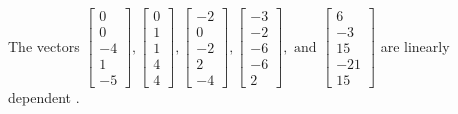 \begin{exercise}
\begin{exerciseStatement}
  \end{exerciseStatement}
  \begin{exerciseAnswer}
   The vectors \(\left[\begin{array}{r}
0 \\
0 \\
-4 \\
1 \\
-5
\end{array}\right] , \left[\begin{array}{r}
0 \\
1 \\
1 \\
4 \\
4
\end{array}\right] , \left[\begin{array}{r}
-2 \\
0 \\
-2 \\
2 \\
-4
\end{array}\right] , \left[\begin{array}{r}
-3 \\
-2 \\
-6 \\
-6 \\
2
\end{array}\right] , \text{ and } \left[\begin{array}{r}
6 \\
-3 \\
15 \\
-21 \\
15
\end{array}\right]\) are 
  	 linearly dependent  .
  


  \end{exerciseAnswer}
\end{exercise}